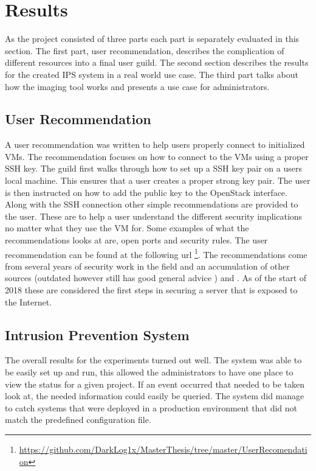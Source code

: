 \documentclass[12pt]{article}
\begin{document}
\section{Results}
As the project consisted of three parts each part is separately evaluated in this section. The first part, user recommendation, describes the complication of different resources into a final user guild. The second section describes the results for the created IPS system in a real world use case. The third part talks about how the imaging tool works and presents a use case for administrators.

\subsection{User Recommendation}
A user recommendation was written to help users properly connect to initialized VMs. The recommendation focuses on how to connect to the VMs using a proper SSH key. The guild first walks through how to set up a SSH key pair on a users local machine. This ensures that a user creates a proper strong key pair. The user is then instructed on how to add the public key to the OpenStack interface. Along with the SSH connection other simple recommendations are provided to the user. These are to help a user understand the different security implications no matter what they use the VM for. Some examples of what the recommendations looks at are, open ports and security rules. The user recommendation can be found at the following url \footnote{\href{https://github.com/DarkLog1x/MasterThesis/tree/master/UserRecomendation}{https://github.com/DarkLog1x/MasterThesis/tree/master/UserRecomendation}}. The recommendations come from several years of security work in the field and an accumulation of other sources (outdated however still has good general advice \cite{bauer2005linux}) and \cite{digOcesecure}. As of the start of 2018 these are considered the first steps in securing a server that is exposed to the Internet.

\subsection{Intrusion Prevention System}
The overall results for the experiments turned out well. The system was able to be easily set up and run, this allowed the administrators to have one place to view the status for a given project. If an event occurred that needed to be taken look at, the needed information could easily be queried. The system did manage to catch systems that were deployed in a production environment that did not match the predefined configuration file.
\end{document}
